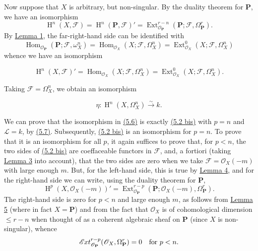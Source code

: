 \documentclass{article}
\newenvironment{eqenv}
  {}
  {}
\newcommand{\oldpage}[1]{\marginpar{\footnotesize$\Big\vert$ \textit{p.~#1}}}
\theoremstyle{definition}
\theoremstyle{definition}
\theoremstyle{definition}
\theoremstyle{definition}
\theoremstyle{remark}
\begin{document}
Now suppose that \(X\) is arbitrary, but non-singular.
By the duality theorem for \(\mathbf{P}\), we have an isomorphism
\[
  \operatorname{H}^n(X,{\mathscr{F}})
  = \operatorname{H}^n(\mathbf{P},{\mathscr{F}})'
  = \operatorname{Ext}_{{\mathscr{O}}_\mathbf{P}}^{r-n}(\mathbf{P};{\mathscr{F}},\Omega_\mathbf{P}^r).
\]
By \protect\hyperlink{fga-1-lemma-1}{Lemma 1}, the far-right-hand side can be identified with
\[
  \operatorname{Hom}_{{\mathscr{O}}_\mathbf{P}}(\mathbf{P};{\mathscr{F}},\omega_X^n)
  = \operatorname{Hom}_{{\mathscr{O}}_X}(X;{\mathscr{F}},\Omega_X^n)
  = \operatorname{Ext}_{{\mathscr{O}}_X}^0(X;{\mathscr{F}},\Omega_X^n)
\]
whence we have an isomorphism

\leavevmode{}%
\begin{eqenv}
\[
  \operatorname{H}^n(X,{\mathscr{F}})'
  = \operatorname{Hom}_{{\mathscr{O}}_X}(X;{\mathscr{F}},\Omega_X^n)
  = \operatorname{Ext}_{{\mathscr{O}}_X}^0(X;{\mathscr{F}},\Omega_X^n).
\tag{5.6}
\]

\end{eqenv}

Taking \({\mathscr{F}}=\Omega_X^n\), we obtain an isomorphism

\leavevmode{}%
\begin{eqenv}
\[
  \eta\colon \operatorname{H}^n(X,\Omega_X^n) \xrightarrow{\sim} k.
\tag{5.7}
\]

\end{eqenv}

\oldpage{149-17}We can prove that the isomorphism in \protect\hyperlink{fga-1-equation-5.6}{(5.6)} is exactly \protect\hyperlink{fga-1-equation-5.2bis}{(5.2 bis)} with \(p=n\) and \({\mathscr{L}}=k\), by \protect\hyperlink{fga-1-equation-5.7}{(5.7)}.
Subsequently, \protect\hyperlink{fga-1-equation-5.2bis}{(5.2 bis)} is an isomorphism for \(p=n\).
To prove that it is an isomorphism for all \(p\), it again suffices to prove that, for \(p<n\), the two sides of \protect\hyperlink{fga-1-equation-5.2bis}{(5.2 bis)} are coeffaceable functors in \({\mathscr{F}}\), and, a fortiori (taking \protect\hyperlink{fga-1-lemma-3}{Lemma 3} into account), that the two sides are zero when we take \({\mathscr{F}}={\mathscr{O}}_X(-m)\) with large enough \(m\).
But, for the left-hand side, this is true by \protect\hyperlink{fga-1-lemma-4}{Lemma 4}, and for the right-hand side we can write, using the duality theorem for \(\mathbf{P}\),
\[
  \operatorname{H}^p(X,{\mathscr{O}}_X(-m))'
  = \operatorname{Ext}_{{\mathscr{O}}_\mathbf{P}}^{r-p}(\mathbf{P};{\mathscr{O}}_X(-m),\Omega_\mathbf{P}^r).
\]
The right-hand side is zero for \(p<n\) and large enough \(m\), as follows from \protect\hyperlink{fga-1-lemma-5}{Lemma 5} (where in fact \(X=\mathbf{P}\)) and from the fact that \({\mathscr{O}}_X\) is of cohomological dimension \(\leqslant r-n\) when thought of as a coherent algebraic sheaf on \(\mathbf{P}\) (since \(X\) is non-singular), whence
\[
  \mathscr{E}\kern -.5pt xt_{{\mathscr{O}}_\mathbf{P}}^{r-p}({\mathscr{O}}_X,\Omega_\mathbf{P}^r) = 0
  \quad\text{for }p<n.
\]
\end{document}
